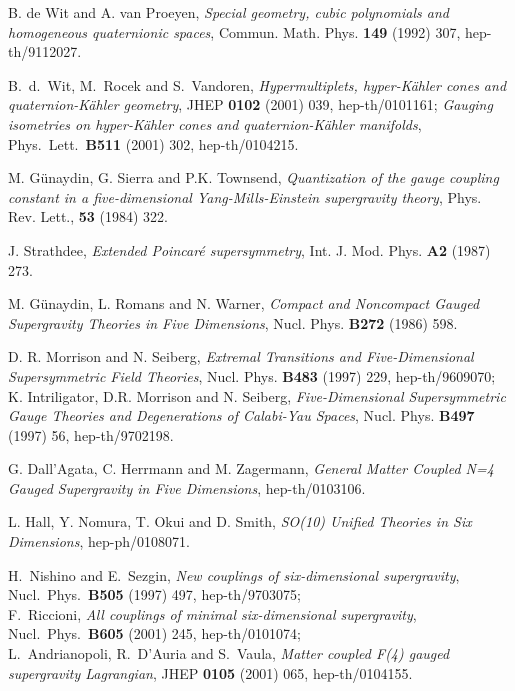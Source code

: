 \documentclass[a4paper,11pt]{article}
\begin{document}
\begin{thebibliography}{99}
 B. de Wit and A. van Proeyen, \emph{Special 
geometry, cubic polynomials and homogeneous quaternionic
spaces}, Commun. Math. Phys. \textbf{149} (1992) 307, hep-th/9112027.

B.~d.~Wit, M.~Rocek and S.~Vandoren,
\emph{Hypermultiplets, hyper-K\"{a}hler cones and quaternion-K\"{a}hler 
geometry},
JHEP {\bf 0102} (2001) 039,
hep-th/0101161;
\emph{Gauging isometries on hyper-K\"{a}hler
cones and
quaternion-K\"{a}hler manifolds},
Phys.\ Lett.\ \textbf{B511} (2001) 302,
hep-th/0104215.

 M. G\"{u}naydin, G. Sierra and  P.K. Townsend,
\emph{Quantization of the gauge coupling constant in a five-dimensional
Yang-Mills-Einstein supergravity theory}, Phys. Rev. Lett., \textbf{53}
(1984) 322.

 J. Strathdee, 
\emph{Extended Poincar\'{e} supersymmetry}, Int. J. Mod. Phys. \textbf{A2}
(1987) 273.

M. G\"{u}naydin, L. Romans and N. Warner,
\emph{Compact and Noncompact Gauged Supergravity Theories in Five
Dimensions}, Nucl. Phys. \textbf{B272} (1986) 598.

D. R. Morrison and N. Seiberg, \emph{Extremal Transitions
and Five-Dimensional Supersymmetric
Field Theories}, Nucl. Phys. \textbf{B483} (1997) 229, 
hep-th/9609070; \\
K. Intriligator, D.R. Morrison and N. Seiberg, 
\emph{Five-Dimensional Supersymmetric Gauge Theories and
Degenerations of Calabi-Yau Spaces}, Nucl. Phys. \textbf{B497} (1997)
56, hep-th/9702198.

  G. Dall'Agata, C. Herrmann and  M. Zagermann,
\emph{General Matter Coupled N=4 Gauged Supergravity in Five Dimensions},
hep-th/0103106. 

L. Hall, Y. Nomura, T. Okui and D. Smith,
\emph{SO(10) Unified Theories in Six Dimensions}, hep-ph/0108071.

H.~Nishino and E.~Sezgin,
\emph{New couplings of six-dimensional supergravity},
Nucl.\ Phys.\ {\bf B505} (1997) 497, hep-th/9703075;\\
F.~Riccioni,
\emph{All couplings of minimal six-dimensional supergravity},
Nucl.\ Phys.\ {\bf B605} (2001) 245, hep-th/0101074;\\
L.~Andrianopoli, R.~D'Auria and S.~Vaula,
\emph{Matter coupled F(4) gauged supergravity Lagrangian},
JHEP {\bf 0105} (2001) 065, hep-th/0104155.

\end{thebibliography}
\end{document}
